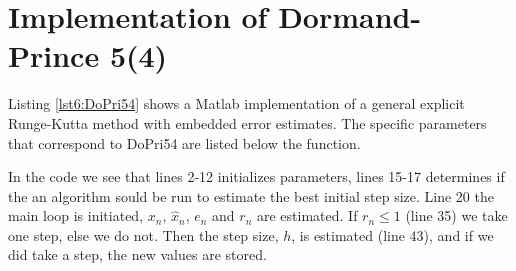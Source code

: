 \section{Implementation of Dormand-Prince 5(4)}
Listing \ref{lst6:DoPri54} shows a Matlab implementation of a general explicit Runge-Kutta method with embedded error estimates. The specific parameters that correspond to DoPri54 are listed below the function. 

In the code we see that lines 2-12 initializes parameters, lines 15-17 determines if the an algorithm sould be run to estimate the best initial step size. Line 20 the main loop is initiated, $x_n$, $\hat x_n$, $e_n$ and $r_n$ are estimated. If $r_n \leq 1$ (line 35) we take one step, else we do not. Then the step size, $h$, is estimated (line 43), and if we did take a step, the new values are stored.


